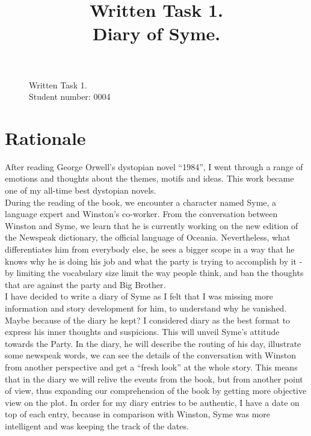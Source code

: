 \documentclass[12pt,a4paper]{article}
\title{Written Task 1. \\ Diary of Syme.}
\author{}
\date{}
\begin{document}
\newpage
\begin{flushleft}
  \begin{figure}[t]
     Written Task 1.\\
    Student number: 0004\\
   \end{figure}
\end{flushleft}

\section*{Rationale}
After reading George Orwell’s dystopian novel “1984”, I went through a range of emotions and thoughts about the themes, motifs and ideas. This work became one of my all-time best dystopian novels.\\

During the reading of the book, we encounter a character named Syme, a language expert and Winston’s co-worker. From the conversation between Winston and Syme, we learn that he is currently working on the new edition of the Newspeak dictionary, the official language of Oceania. Nevertheless, what differentiates him from everybody else, he sees a bigger scope in a way that he knows why he is doing his job and what the party is trying to accomplish by it - by limiting the vocabulary size limit the way people think, and ban the thoughts that are against the party and Big Brother. \\

I have decided to write a diary of Syme as I felt that I was missing more information and story development for him, to understand why he vanished. Maybe because of the diary he kept? I considered diary as the best format to express his inner thoughts and suspicions. This will unveil Syme’s attitude towards the Party. In the diary, he will describe the routing of his day, illustrate some newspeak words, we can see the details of the conversation with Winston from another perspective and get a “fresh look” at the whole story. This means that in the diary we will relive the events from the book, but from another point of view, thus expanding our comprehension of the book by getting more objective view on the plot. In order for my diary entries to be authentic, I have a date on top of each entry, because in comparison with Winston, Syme was more intelligent and was keeping the track of the dates.\\
\end{document}
